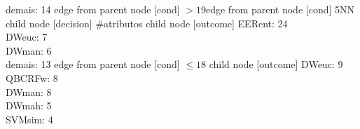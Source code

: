{{{{demais: 14} edge from parent node [cond] {$>19$}}edge from parent node [cond] {5NN}}
%
child {node [decision] {\#atributos}
child {node [outcome] {
EERent: 24\\
DWeuc: 7\\
DWman: 6\\
demais: 13} edge from parent node [cond] {$\leq18$}}
child {node [outcome] {
DWeuc: 9\\
QBCRFw: 8\\
DWman: 8\\
DWmah: 5\\
SVMsim: 4\\
}}}}
